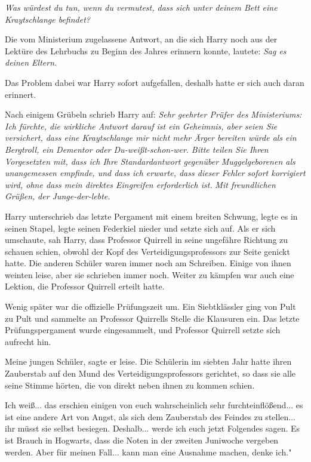 \emph{\glqq{}Was würdest du tun, wenn du vermutest, dass sich unter deinem Bett
eine Kraytschlange befindet?\grqq{}}

Die vom Ministerium zugelassene Antwort, an die sich Harry noch aus der Lektüre
des Lehrbuchs zu Beginn des Jahres erinnern konnte, lautete: \emph{Sag es deinen
Eltern.}

Das Problem dabei war Harry sofort aufgefallen, deshalb hatte er sich auch daran
erinnert.

Nach einigem Grübeln schrieb Harry auf:
\emph{Sehr geehrter Prüfer des Ministeriums:}
\emph{Ich fürchte, die wirkliche Antwort darauf ist ein Geheimnis, aber seien
Sie versichert, dass eine Kraytschlange mir nicht mehr Ärger bereiten würde als
ein Bergtroll, ein Dementor oder Du-weißt-schon-wer.} \emph{Bitte teilen Sie
Ihren Vorgesetzten mit, dass ich Ihre Standardantwort gegenüber
}\emph{Muggelgeborenen als unangemessen empfinde, und dass ich erwarte, dass
dieser Fehler sofort korrigiert wird, ohne dass mein direktes Eingreifen
erforderlich ist.} \emph{ Mit freundlichen Grüßen,}
\emph{der Junge-der-lebte.}

Harry unterschrieb das letzte Pergament mit einem breiten Schwung, legte es in
seinen Stapel, legte seinen Federkiel nieder und setzte sich auf. Als er sich
umschaute, sah Harry, dass Professor Quirrell in seine ungefähre Richtung zu
schauen schien, obwohl der Kopf des Verteidigungsprofessors zur Seite genickt
hatte. Die anderen Schüler waren immer noch am Schreiben. Einige von ihnen
weinten leise, aber sie schrieben immer noch. Weiter zu kämpfen war auch eine
Lektion, die Professor Quirrell erteilt hatte.

Wenig später war die offizielle Prüfungszeit um. Ein Siebtklässler ging von Pult
zu Pult und sammelte an Professor Quirrells Stelle die Klausuren ein. Das letzte
Prüfungspergament wurde eingesammelt, und Professor Quirrell setzte sich
aufrecht hin.

\glqq{}Meine jungen Schüler\grqq{}, sagte er leise. Die Schülerin im siebten Jahr
hatte ihren Zauberstab auf den Mund des Verteidigungsprofessors gerichtet, so
dass sie alle seine Stimme hörten, die von direkt neben ihnen zu kommen schien.

\glqq{}Ich weiß... das erschien einigen von euch wahrscheinlich sehr
furchteinflößend... es ist eine andere Art von Angst, als sich dem Zauberstab
des Feindes zu stellen... ihr müsst sie selbst besiegen. Deshalb... werde ich
euch jetzt Folgendes sagen. Es ist Brauch in Hogwarts, dass die Noten in der
zweiten Juniwoche vergeben werden. Aber für meinen Fall... kann man eine
Ausnahme machen, denke ich."

